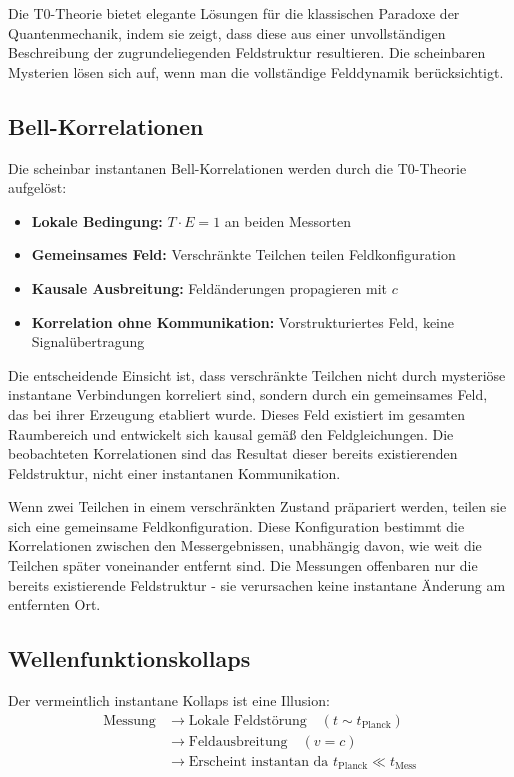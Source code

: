 	Die T0-Theorie bietet elegante Lösungen für die klassischen Paradoxe der Quantenmechanik, indem sie zeigt, dass diese aus einer unvollständigen Beschreibung der zugrundeliegenden Feldstruktur resultieren. Die scheinbaren Mysterien lösen sich auf, wenn man die vollständige Felddynamik berücksichtigt.
	
	\subsection{Bell-Korrelationen}
	
	Die scheinbar instantanen Bell-Korrelationen werden durch die T0-Theorie aufgelöst:
	
	\begin{itemize}
		\item \textbf{Lokale Bedingung:} $T \cdot E = 1$ an beiden Messorten
		\item \textbf{Gemeinsames Feld:} Verschränkte Teilchen teilen Feldkonfiguration
		\item \textbf{Kausale Ausbreitung:} Feldänderungen propagieren mit $c$
		\item \textbf{Korrelation ohne Kommunikation:} Vorstrukturiertes Feld, keine Signalübertragung
	\end{itemize}
	
	Die entscheidende Einsicht ist, dass verschränkte Teilchen nicht durch mysteriöse instantane Verbindungen korreliert sind, sondern durch ein gemeinsames Feld, das bei ihrer Erzeugung etabliert wurde. Dieses Feld existiert im gesamten Raumbereich und entwickelt sich kausal gemäß den Feldgleichungen. Die beobachteten Korrelationen sind das Resultat dieser bereits existierenden Feldstruktur, nicht einer instantanen Kommunikation.
	
	Wenn zwei Teilchen in einem verschränkten Zustand präpariert werden, teilen sie sich eine gemeinsame Feldkonfiguration. Diese Konfiguration bestimmt die Korrelationen zwischen den Messergebnissen, unabhängig davon, wie weit die Teilchen später voneinander entfernt sind. Die Messungen offenbaren nur die bereits existierende Feldstruktur - sie verursachen keine instantane Änderung am entfernten Ort.
	
	\subsection{Wellenfunktionskollaps}
	
	Der vermeintlich instantane Kollaps ist eine Illusion:
	\begin{align}
		\text{Messung} &\rightarrow \text{Lokale Feldstörung} \quad (t \sim t_{\text{Planck}}) \\
		&\rightarrow \text{Feldausbreitung} \quad (v = c) \\
		&\rightarrow \text{Erscheint instantan da } t_{\text{Planck}} \ll t_{\text{Mess}}
	\end{align}
	
